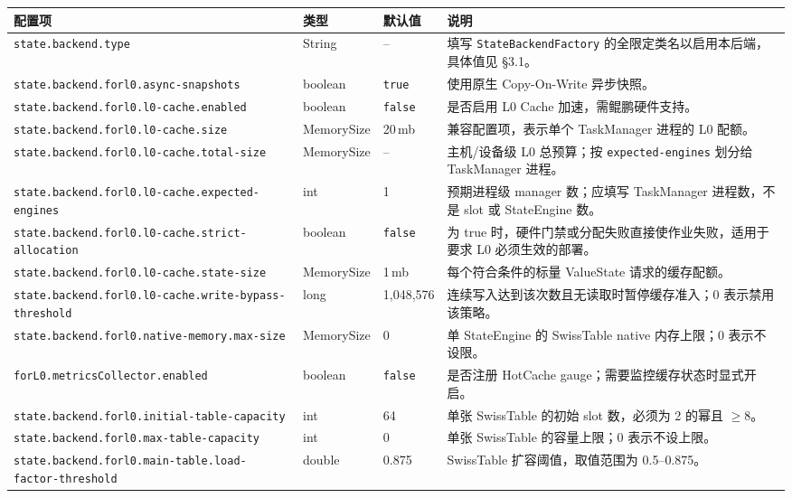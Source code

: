 \documentclass[a4paper,11pt]{article}
\newcommand{\cfg}[1]{\nolinkurl{#1}}
\begin{document}
\begin{table}[H]
\centering
\footnotesize
\begin{tabularx}{\textwidth}{L{6.2cm} L{1.6cm} L{1.6cm} X}
\toprule
\textbf{配置项} & \textbf{类型} & \textbf{默认值} & \textbf{说明} \\
\midrule
\cfg{state.backend.type} & String & -- & 填写 \texttt{StateBackendFactory} 的全限定类名以启用本后端，具体值见 \S 3.1。 \\
\cfg{state.backend.forl0.async-snapshots} & boolean & \texttt{true} & 使用原生 Copy-On-Write 异步快照。 \\
\cfg{state.backend.forl0.l0-cache.enabled} & boolean & \texttt{false} & 是否启用 L0 Cache 加速，需鲲鹏硬件支持。 \\
\cfg{state.backend.forl0.l0-cache.size} & MemorySize & 20\,mb & 兼容配置项，表示单个 TaskManager 进程的 L0 配额。 \\
\cfg{state.backend.forl0.l0-cache.total-size} & MemorySize & -- & 主机/设备级 L0 总预算；按 \texttt{expected-engines} 划分给 TaskManager 进程。 \\
\cfg{state.backend.forl0.l0-cache.expected-engines} & int & 1 & 预期进程级 manager 数；应填写 TaskManager 进程数，不是 slot 或 StateEngine 数。 \\
\cfg{state.backend.forl0.l0-cache.strict-allocation} & boolean & \texttt{false} & 为 true 时，硬件门禁或分配失败直接使作业失败，适用于要求 L0 必须生效的部署。 \\
\cfg{state.backend.forl0.l0-cache.state-size} & MemorySize & 1\,mb & 每个符合条件的标量 ValueState 请求的缓存配额。 \\
\cfg{state.backend.forl0.l0-cache.write-bypass-threshold} & long & 1,048,576 & 连续写入达到该次数且无读取时暂停缓存准入；0 表示禁用该策略。 \\
\cfg{state.backend.forl0.native-memory.max-size} & MemorySize & 0 & 单 StateEngine 的 SwissTable native 内存上限；0 表示不设限。 \\
\cfg{forL0.metricsCollector.enabled} & boolean & \texttt{false} & 是否注册 HotCache gauge；需要监控缓存状态时显式开启。 \\
\cfg{state.backend.forl0.initial-table-capacity} & int & 64 & 单张 SwissTable 的初始 slot 数，必须为 2 的幂且 $\ge 8$。 \\
\cfg{state.backend.forl0.max-table-capacity} & int & 0 & 单张 SwissTable 的容量上限；0 表示不设上限。 \\
\cfg{state.backend.forl0.main-table.load-factor-threshold} & double & 0.875 & SwissTable 扩容阈值，取值范围为 0.5--0.875。 \\
\bottomrule
\end{tabularx}
\end{table}
\end{document}
